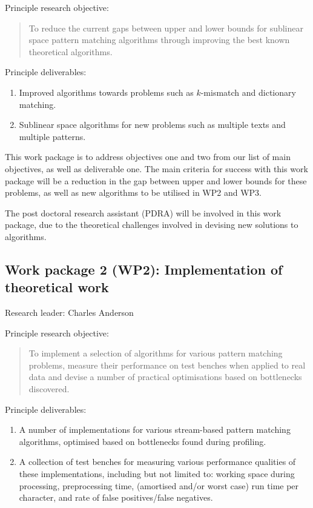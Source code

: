 \documentclass[a4paper,11pt]{article}
\begin{document}
    Principle research objective:
    \begin{quote}
        To reduce the current gaps between upper and lower bounds for sublinear space pattern matching algorithms through improving the best known theoretical algorithms.
    \end{quote}

    Principle deliverables:
    \begin{enumerate}
        \item Improved algorithms towards problems such as $k$-mismatch and dictionary matching.
        \item Sublinear space algorithms for new problems such as multiple texts and multiple patterns.
    \end{enumerate}

    This work package is to address objectives one and two from our list of main objectives, as well as deliverable one. The main criteria for success with this work package will be a reduction in the gap between upper and lower bounds for these problems, as well as new algorithms to be utilised in WP2 and WP3.

    The post doctoral research assistant (PDRA) will be involved in this work package, due to the theoretical challenges involved in devising new solutions to algorithms.

    \subsection*{Work package 2 (WP2): Implementation of theoretical work}

    Research leader: Charles Anderson

    Principle research objective:
    \begin{quote}
        To implement a selection of algorithms for various pattern matching problems, measure their performance on test benches when applied to real data and devise a number of practical optimisations based on bottlenecks discovered.
    \end{quote}

    Principle deliverables:
    \begin{enumerate}
        \item A number of implementations for various stream-based pattern matching algorithms, optimised based on bottlenecks found during profiling.
        \item A collection of test benches for measuring various performance qualities of these implementations, including but not limited to: working space during processing, preprocessing time, (amortised and/or worst case) run time per character, and rate of false positives/false negatives.
    \end{enumerate}
\end{document}
